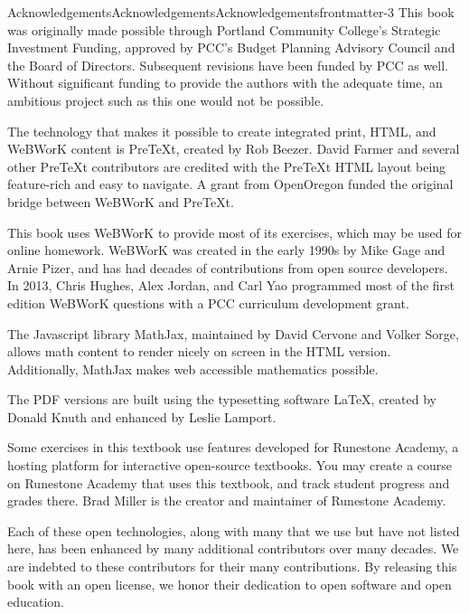 \documentclass[twoside,10pt,]{book}
\numberwithin{equation}{section}
\begin{document}
\begin{acknowledgement}{Acknowledgements}{Acknowledgements}{}{Acknowledgements}{}{}{frontmatter-3}
This book was originally made possible through Portland Community College's Strategic Investment Funding, approved by PCC's Budget Planning Advisory Council and the Board of Directors. Subsequent revisions have been funded by PCC as well. Without significant funding to provide the authors with the adequate time, an ambitious project such as this one would not be possible.%
\par
The technology that makes it possible to create integrated print, HTML, and WeBWorK content is PreTeXt, created by Rob Beezer. David Farmer and several other PreTeXt contributors are credited with the PreTeXt HTML layout being feature-rich and easy to navigate. A grant from OpenOregon funded the original bridge between WeBWorK and PreTeXt.%
\par
This book uses WeBWorK to provide most of its exercises, which may be used for online homework. WeBWorK was created in the early 1990s by Mike Gage and Arnie Pizer, and has had decades of contributions from open source developers. In 2013, Chris Hughes, Alex Jordan, and Carl Yao programmed most of the first edition WeBWorK questions with a PCC curriculum development grant.%
\par
The Javascript library MathJax, maintained by David Cervone and Volker Sorge, allows math content to render nicely on screen in the HTML version. Additionally, MathJax makes web accessible mathematics possible.%
\par
The PDF versions are built using the typesetting software \LaTeX{}, created by Donald Knuth and enhanced by Leslie Lamport.%
\par
Some exercises in this textbook use features developed for Runestone Academy, a hosting platform for interactive open-source textbooks. You may create a course on Runestone Academy that uses this textbook, and track student progress and grades there. Brad Miller is the creator and maintainer of Runestone Academy.%
\par
Each of these open technologies, along with many that we use but have not listed here, has been enhanced by many additional contributors over many decades. We are indebted to these contributors for their many contributions. By releasing this book with an open license, we honor their dedication to open software and open education.%
\end{acknowledgement}
%
%
\typeout{************************************************}
\end{document}
